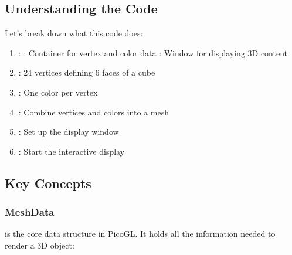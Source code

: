 \documentclass[a4paper,10pt,english,openany,oneside]{sphinxmanual}
\begin{document}
\subsection{Understanding the Code}
\label{\detokenize{quickstart:understanding-the-code}}
\sphinxAtStartPar
Let’s break down what this code does:
\begin{enumerate}
%
\item {} 
\sphinxAtStartPar
{}:
\sphinxhyphen{} : Container for vertex and color data
\sphinxhyphen{} : Window for displaying 3D content

\item {} 
\sphinxAtStartPar
{}: 24 vertices defining 6 faces of a cube

\item {} 
\sphinxAtStartPar
{}: One color per vertex

\item {} 
\sphinxAtStartPar
{}: Combine vertices and colors into a mesh

\item {} 
\sphinxAtStartPar
{}: Set up the display window

\item {} 
\sphinxAtStartPar
{}: Start the interactive display

\end{enumerate}


\subsection{Key Concepts}
\label{\detokenize{quickstart:key-concepts}}

\subsubsection{MeshData}
\label{\detokenize{quickstart:meshdata}}
\sphinxAtStartPar
{} is the core data structure in PicoGL. It holds all the information needed to render a 3D object:

\begin{sphinxVerbatim}[commandchars=\\\{\}]
  
        
            
          
                  
\end{sphinxVerbatim}
\end{document}
